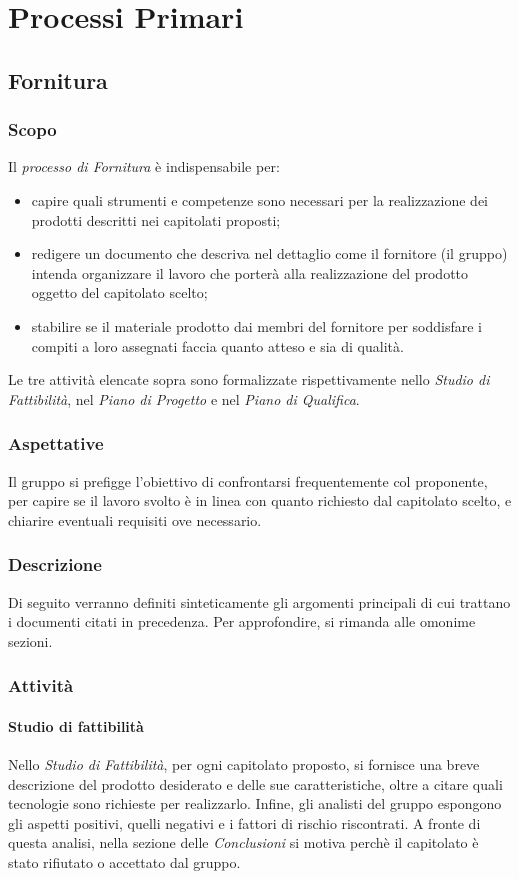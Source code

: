 \section{Processi Primari} 


\subsection{Fornitura}

	\subsubsection{Scopo}
	\text Il \textit{processo di Fornitura} è indispensabile per:
	\begin{itemize}
	\item capire quali strumenti e competenze sono necessari per la realizzazione dei prodotti descritti nei capitolati proposti;
	\item redigere un documento che descriva nel dettaglio come il fornitore (il gruppo) intenda organizzare il lavoro che porterà alla realizzazione del prodotto oggetto del capitolato scelto;
	\item stabilire se il materiale prodotto dai membri del fornitore per soddisfare i compiti a loro assegnati faccia quanto atteso e sia di qualità.    
	\end{itemize}
Le tre attività elencate sopra sono formalizzate rispettivamente nello \textit{Studio di Fattibilità}, nel \textit{Piano di Progetto} e nel \textit{Piano di Qualifica}.
 	\subsubsection{Aspettative}
Il gruppo si prefigge l'obiettivo di confrontarsi frequentemente col proponente, per capire se il lavoro svolto è in linea con quanto richiesto dal capitolato scelto, e chiarire eventuali requisiti ove necessario.
	\subsubsection{Descrizione}
	Di seguito verranno definiti sinteticamente gli argomenti principali di cui trattano i documenti citati in precedenza. Per approfondire, si rimanda alle omonime sezioni. 
	\subsubsection{Attività}

		\paragraph{Studio di fattibilità}
			Nello \textit{Studio di Fattibilità}, per ogni capitolato proposto, si fornisce una breve descrizione del prodotto desiderato e delle sue caratteristiche, oltre a citare quali tecnologie sono richieste per realizzarlo. Infine, gli analisti del gruppo espongono gli aspetti positivi, quelli negativi e i fattori di rischio riscontrati. A fronte di questa analisi, nella sezione delle \textit{Conclusioni} si motiva perchè il capitolato è stato rifiutato o accettato dal gruppo.  

